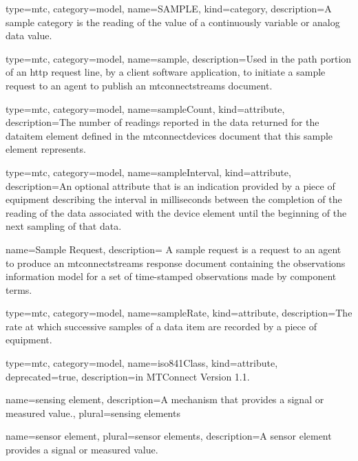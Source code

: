 {
  type=mtc,
  category=model,
  name={SAMPLE},
  kind={category},
  description={A \gls{sample category} is the reading of the value of a continuously variable or analog data value.}
}


{
  type=mtc,
  category=model,
  name={sample},
  description={Used in the path portion of an \gls{http request line}, by a client software application, to initiate a \gls{sample request} to an \gls{agent} to publish an \gls{mtconnectstreams} document.}
}


{
  type=mtc,
  category=model,
  name={sampleCount},
  kind={attribute},
  description={The number of readings reported in the data returned for the \gls{dataitem} element defined in the \gls{mtconnectdevices} document that this \gls{sample} element represents.}
}


{
  type=mtc,
  category=model,
  name={sampleInterval},
  kind={attribute},
  description={An optional attribute that is an indication provided by a piece of equipment describing the interval in milliseconds between the completion of the reading of the data associated with the \gls{device} element until the beginning of the next sampling of that data.}
}


{
  name={Sample Request},
  description= {A \gls{sample request} is a \gls{request} to an \gls{agent} to produce an \gls{mtconnectstreams response document} containing the \gls{observations information model} for a set of time-stamped \glspl{observation} made by \glspl{component term}.}
}


{
  type=mtc,
  category=model,
  name={sampleRate},
  kind={attribute},
  description={The rate at which successive samples of a data item are recorded by a piece of equipment.}
}

{
  type=mtc,
  category=model,
  name={iso841Class},
  kind={attribute},
  deprecated={true},
  description={\DEPRECATED in MTConnect Version 1.1.}
}


{
  name={sensing element},
  description={A mechanism that provides a signal or measured value.},
  plural={sensing elements}
}


{
  name={sensor element},
  plural={sensor elements},
  description={A \gls{sensor element} provides a signal or measured value.}
}


